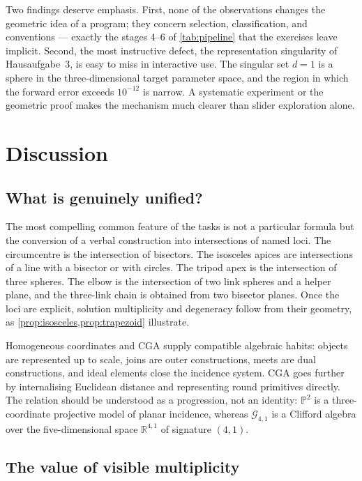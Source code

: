 \documentclass[11pt,a4paper]{article}
\theoremstyle{plain}
\theoremstyle{definition}
\theoremstyle{remark}
\newcommand{\R}{\mathbb{R}}
\newcommand{\PP}{\mathbb{P}}
\newcommand{\GA}{\mathcal{G}_{4,1}}
\begin{document}
Two findings deserve emphasis. First, none of the observations changes the
geometric idea of a program; they concern selection, classification, and
conventions --- exactly the stages 4--6 of \cref{tab:pipeline} that the
exercises leave implicit. Second, the most instructive defect, the
representation singularity of Hausaufgabe~3, is easy to miss in interactive
use. The singular set $d=1$ is a sphere in the three-dimensional target
parameter space, and the region in which the forward error exceeds
$10^{-12}$ is narrow. A systematic experiment or the geometric proof makes
the mechanism much clearer than slider exploration alone.

\section{Discussion}\label{sec:discussion}

\subsection{What is genuinely unified?}

The most compelling common feature of the tasks is not a particular formula but
the conversion of a verbal construction into intersections of named loci. The
circumcentre is the intersection of bisectors. The isosceles apices are
intersections of a line with a bisector or with circles. The tripod apex is the
intersection of three spheres. The elbow is the intersection of two link
spheres and a helper plane, and the three-link chain is obtained from two
bisector planes. Once the loci are explicit, solution multiplicity and
degeneracy follow from their geometry, as \cref{prop:isosceles,prop:trapezoid}
illustrate.

Homogeneous coordinates and CGA supply compatible algebraic habits: objects are
represented up to scale, joins are outer constructions, meets are dual
constructions, and ideal elements close the incidence system. CGA goes further
by internalising Euclidean distance and representing round primitives directly.
The relation should be understood as a progression, not an identity: $\PP^2$ is a
three-coordinate projective model of planar incidence, whereas $\GA$ is a
Clifford algebra over the five-dimensional space $\R^{4,1}$ of signature
$(4,1)$.

\subsection{The value of visible multiplicity}
\end{document}
